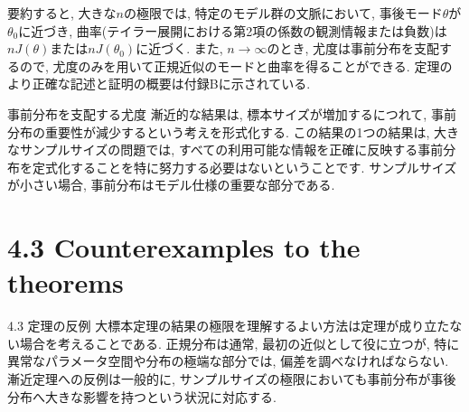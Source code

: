 \documentclass[10pt,dvipdfmx,a4]{beamer}
\begin{document}

\begin{frame}
要約すると, 大きな$n$の極限では, 特定のモデル群の文脈において, 事後モード$\theta$が$\theta_0$に近づき, 曲率(テイラー展開における第2項の係数の観測情報または負数)は$nJ(\theta)$または$nJ(\theta_0)$に近づく.
また, $n\rightarrow\infty$のとき, 尤度は事前分布を支配するので, 尤度のみを用いて正規近似のモードと曲率を得ることができる.
定理のより正確な記述と証明の概要は付録Bに示されている.
\end{frame}


\begin{frame}{事前分布を支配する尤度}
漸近的な結果は, 標本サイズが増加するにつれて, 事前分布の重要性が減少するという考えを形式化する.
この結果の1つの結果は, 大きなサンプルサイズの問題では, すべての利用可能な情報を正確に反映する事前分布を定式化することを特に努力する必要はないということです.
サンプルサイズが小さい場合, 事前分布はモデル仕様の重要な部分である.
\end{frame}

\section{4.3 Counterexamples to the theorems}
\begin{frame}{4.3 定理の反例}
大標本定理の結果の極限を理解するよい方法は定理が成り立たない場合を考えることである.
正規分布は通常, 最初の近似として役に立つが, 特に異常なパラメータ空間や分布の極端な部分では, 偏差を調べなければならない.
漸近定理への反例は一般的に, サンプルサイズの極限においても事前分布が事後分布へ大きな影響を持つという状況に対応する.
\end{frame}

\end{document}
